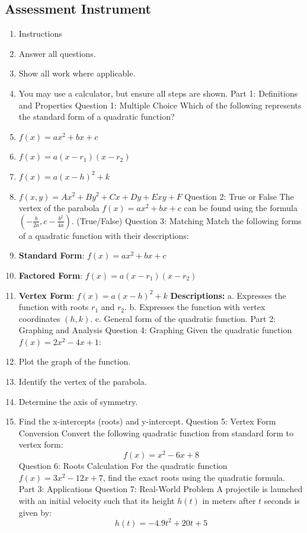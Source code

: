 \subsection{Assessment Instrument}

\begin{enumerate}
    \item Instructions
    \item Answer all questions.
    \item Show all work where applicable.
    \item You may use a calculator, but ensure all steps are shown. Part 1: Definitions and Properties Question 1: Multiple Choice Which of the following represents the standard form of a quadratic function?
    \item $ f(x) = ax^2 + bx + c $
    \item $ f(x) = a(x - r_1)(x - r_2) $
    \item $ f(x) = a(x - h)^2 + k $
    \item $ f(x, y) = Ax^2 + By^2 + Cx + Dy + Exy + F $ Question 2: True or False The vertex of the parabola $ f(x) = ax^2 + bx + c $ can be found using the formula $ \left(-\frac{b}{2a}, c - \frac{b^2}{4a}\right) $. (True/False) Question 3: Matching Match the following forms of a quadratic function with their descriptions:
    \item \textbf{Standard Form}: $ f(x) = ax^2 + bx + c $
    \item \textbf{Factored Form}: $ f(x) = a(x - r_1)(x - r_2) $
    \item \textbf{Vertex Form}: $ f(x) = a(x - h)^2 + k $ \textbf{Descriptions:} a. Expresses the function with roots $ r_1 $ and $ r_2 $. b. Expresses the function with vertex coordinates $ (h, k) $. c. General form of the quadratic function. Part 2: Graphing and Analysis Question 4: Graphing Given the quadratic function $ f(x) = 2x^2 - 4x + 1 $:
    \item Plot the graph of the function.
    \item Identify the vertex of the parabola.
    \item Determine the axis of symmetry.
    \item Find the x-intercepts (roots) and y-intercept. Question 5: Vertex Form Conversion Convert the following quadratic function from standard form to vertex form: $$ f(x) = x^2 - 6x + 8 $$ Question 6: Roots Calculation For the quadratic function $ f(x) = 3x^2 - 12x + 7 $, find the exact roots using the quadratic formula. Part 3: Applications Question 7: Real-World Problem A projectile is launched with an initial velocity such that its height $ h(t) $ in meters after $ t $ seconds is given by: $$ h(t) = -4.9t^2 + 20t + 5 $$

\end{enumerate}
